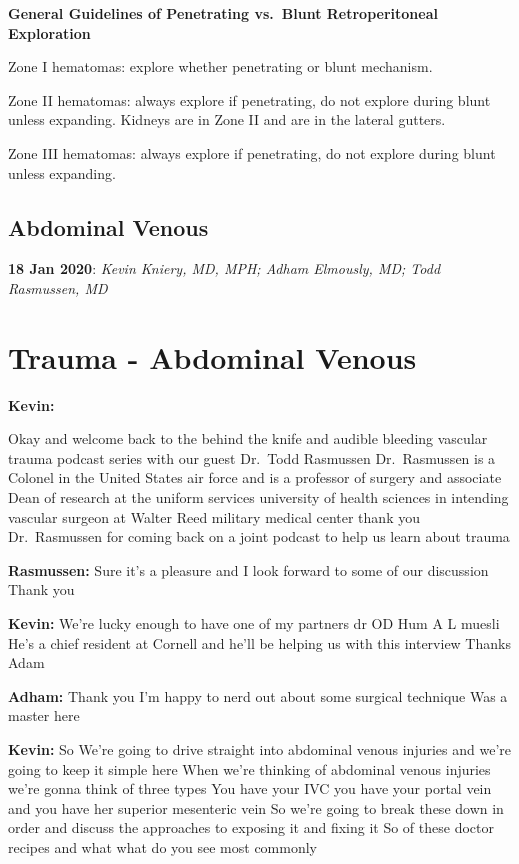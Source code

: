 \documentclass[
]{book}
\begin{document}
\textbf{General Guidelines of Penetrating vs.~Blunt Retroperitoneal Exploration}

Zone I hematomas: explore whether penetrating or blunt mechanism.

Zone II hematomas: always explore if penetrating, do not explore during blunt unless expanding. Kidneys are in Zone II and are in the lateral gutters.

Zone III hematomas: always explore if penetrating, do not explore during blunt unless expanding.

\hypertarget{abdominal-venous}{%
\section{Abdominal Venous}\label{abdominal-venous}}

\textbf{18 Jan 2020}: \emph{Kevin Kniery, MD, MPH; Adham Elmously, MD; Todd
Rasmussen, MD}

\hypertarget{trauma---abdominal-venous}{%
\chapter{Trauma - Abdominal Venous}\label{trauma---abdominal-venous}}

\textbf{Kevin:}

Okay and welcome back to the behind the knife and audible bleeding vascular trauma podcast series with our guest Dr.~Todd Rasmussen Dr.~Rasmussen is a Colonel in the United States air force and is a professor of surgery and associate Dean of research at the uniform services university of health sciences in intending vascular surgeon at Walter Reed military medical center thank you Dr.~Rasmussen for coming back on a joint podcast to help us learn about trauma

\textbf{Rasmussen:} Sure it's a pleasure and I look forward to some of our discussion Thank you

\textbf{Kevin:} We're lucky enough to have one of my partners dr OD Hum A L muesli He's a chief resident at Cornell and he'll be helping us with this interview Thanks Adam

\textbf{Adham:} Thank you I'm happy to nerd out about some surgical technique Was a master here

\textbf{Kevin:} So We're going to drive straight into abdominal venous injuries and we're going to keep it simple here When we're thinking of abdominal venous injuries we're gonna think of three types You have your IVC you have your portal vein and you have her superior mesenteric vein So we're going to break these down in order and discuss the approaches to exposing it and fixing it So of these doctor recipes and what what do you see most commonly
\end{document}
